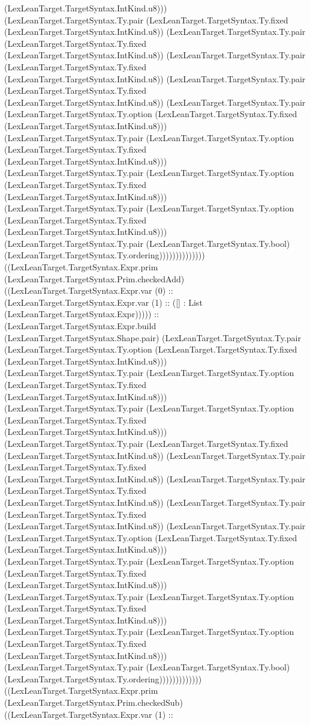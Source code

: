 \documentclass[11pt]{article}
\begin{document}
(LexLeanTarget.TargetSyntax.IntKind.u8))) (LexLeanTarget.TargetSyntax.Ty.pair (LexLeanTarget.TargetSyntax.Ty.fixed (LexLeanTarget.TargetSyntax.IntKind.u8)) (LexLeanTarget.TargetSyntax.Ty.pair (LexLeanTarget.TargetSyntax.Ty.fixed (LexLeanTarget.TargetSyntax.IntKind.u8)) (LexLeanTarget.TargetSyntax.Ty.pair (LexLeanTarget.TargetSyntax.Ty.fixed (LexLeanTarget.TargetSyntax.IntKind.u8)) (LexLeanTarget.TargetSyntax.Ty.pair (LexLeanTarget.TargetSyntax.Ty.fixed (LexLeanTarget.TargetSyntax.IntKind.u8)) (LexLeanTarget.TargetSyntax.Ty.pair (LexLeanTarget.TargetSyntax.Ty.option (LexLeanTarget.TargetSyntax.Ty.fixed (LexLeanTarget.TargetSyntax.IntKind.u8))) (LexLeanTarget.TargetSyntax.Ty.pair (LexLeanTarget.TargetSyntax.Ty.option (LexLeanTarget.TargetSyntax.Ty.fixed (LexLeanTarget.TargetSyntax.IntKind.u8))) (LexLeanTarget.TargetSyntax.Ty.pair (LexLeanTarget.TargetSyntax.Ty.option (LexLeanTarget.TargetSyntax.Ty.fixed (LexLeanTarget.TargetSyntax.IntKind.u8))) (LexLeanTarget.TargetSyntax.Ty.pair (LexLeanTarget.TargetSyntax.Ty.option (LexLeanTarget.TargetSyntax.Ty.fixed (LexLeanTarget.TargetSyntax.IntKind.u8))) (LexLeanTarget.TargetSyntax.Ty.pair (LexLeanTarget.TargetSyntax.Ty.bool) (LexLeanTarget.TargetSyntax.Ty.ordering)))))))))))))) ((LexLeanTarget.TargetSyntax.Expr.prim (LexLeanTarget.TargetSyntax.Prim.checkedAdd) ((LexLeanTarget.TargetSyntax.Expr.var (0) :: (LexLeanTarget.TargetSyntax.Expr.var (1) :: ([] : List (LexLeanTarget.TargetSyntax.Expr))))) :: (LexLeanTarget.TargetSyntax.Expr.build (LexLeanTarget.TargetSyntax.Shape.pair) (LexLeanTarget.TargetSyntax.Ty.pair (LexLeanTarget.TargetSyntax.Ty.option (LexLeanTarget.TargetSyntax.Ty.fixed (LexLeanTarget.TargetSyntax.IntKind.u8))) (LexLeanTarget.TargetSyntax.Ty.pair (LexLeanTarget.TargetSyntax.Ty.option (LexLeanTarget.TargetSyntax.Ty.fixed (LexLeanTarget.TargetSyntax.IntKind.u8))) (LexLeanTarget.TargetSyntax.Ty.pair (LexLeanTarget.TargetSyntax.Ty.option (LexLeanTarget.TargetSyntax.Ty.fixed (LexLeanTarget.TargetSyntax.IntKind.u8))) (LexLeanTarget.TargetSyntax.Ty.pair (LexLeanTarget.TargetSyntax.Ty.fixed (LexLeanTarget.TargetSyntax.IntKind.u8)) (LexLeanTarget.TargetSyntax.Ty.pair (LexLeanTarget.TargetSyntax.Ty.fixed (LexLeanTarget.TargetSyntax.IntKind.u8)) (LexLeanTarget.TargetSyntax.Ty.pair (LexLeanTarget.TargetSyntax.Ty.fixed (LexLeanTarget.TargetSyntax.IntKind.u8)) (LexLeanTarget.TargetSyntax.Ty.pair (LexLeanTarget.TargetSyntax.Ty.fixed (LexLeanTarget.TargetSyntax.IntKind.u8)) (LexLeanTarget.TargetSyntax.Ty.pair (LexLeanTarget.TargetSyntax.Ty.option (LexLeanTarget.TargetSyntax.Ty.fixed (LexLeanTarget.TargetSyntax.IntKind.u8))) (LexLeanTarget.TargetSyntax.Ty.pair (LexLeanTarget.TargetSyntax.Ty.option (LexLeanTarget.TargetSyntax.Ty.fixed (LexLeanTarget.TargetSyntax.IntKind.u8))) (LexLeanTarget.TargetSyntax.Ty.pair (LexLeanTarget.TargetSyntax.Ty.option (LexLeanTarget.TargetSyntax.Ty.fixed (LexLeanTarget.TargetSyntax.IntKind.u8))) (LexLeanTarget.TargetSyntax.Ty.pair (LexLeanTarget.TargetSyntax.Ty.option (LexLeanTarget.TargetSyntax.Ty.fixed (LexLeanTarget.TargetSyntax.IntKind.u8))) (LexLeanTarget.TargetSyntax.Ty.pair (LexLeanTarget.TargetSyntax.Ty.bool) (LexLeanTarget.TargetSyntax.Ty.ordering))))))))))))) ((LexLeanTarget.TargetSyntax.Expr.prim (LexLeanTarget.TargetSyntax.Prim.checkedSub) ((LexLeanTarget.TargetSyntax.Expr.var (1) :: 
\end{document}
